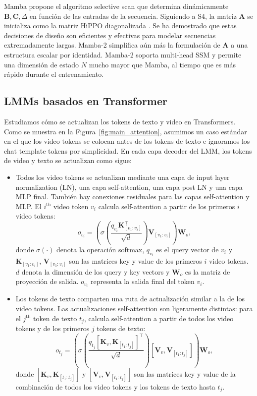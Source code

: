 Mamba propone el algoritmo selective scan que determina dinámicamente $\mathbf{B}, \mathbf{C}, \Delta$ en función de las entradas de la secuencia. Siguiendo a S4, la matriz $\mathbf{A}$ se inicializa como la matriz HiPPO diagonalizada \cite{gu2020hippo}. Se ha demostrado que estas decisiones de diseño son eficientes y efectivas para modelar secuencias extremadamente largas. Mamba-2 \cite{dao2024transformers} simplifica aún más la formulación de $\mathbf{A}$ a una estructura escalar por identidad. Mamba-2 soporta multi-head SSM y permite una dimensión de estado $N$ mucho mayor que Mamba, al tiempo que es más rápido durante el entrenamiento.


\subsection{LMMs basados en Transformer}
\label{sec:autoregressive_lmm}
Estudiamos cómo se actualizan los tokens de texto y video en Transformers. Como se muestra en la Figura~\ref{fig:main_attention}, asumimos un caso estándar en el que los video tokens se colocan antes de los tokens de texto e ignoramos los chat template tokens por simplicidad. En cada capa decoder del LMM, los tokens de video y texto se actualizan como sigue:
\begin{itemize}
    \item Todos los video tokens se actualizan mediante una capa de input layer normalization (LN), una capa self-attention, una capa post LN y una capa MLP final. También hay conexiones residuales para las capas self-attention y MLP. El $i^{\mathrm{th}}$ video token $v_i$ calcula self-attention a partir de los primeros $i$ video tokens:
    \begin{equation}
    \label{equ:causal_self_attention_video}
        o_{v_i}=(\sigma(\frac{q_{v_i} \mathbf{K}_{[v_1:v_i]}^\top}{\sqrt{d}})\mathbf{V}_{[v_1:v_i]})\mathbf{W}_{o},
    \end{equation}
    donde $\sigma(\cdot)$ denota la operación softmax, $q_{v_i}$ es el query vector de $v_i$ y $\mathbf{K}_{[v_1:v_i]}$, $\mathbf{V}_{[v_1:v_i]}$ son las matrices key y value de los primeros $i$ video tokens. $d$ denota la dimensión de los query y key vectors y $\mathbf{W}_{o}$ es la matriz de proyección de salida. $o_{v_i}$ representa la salida final del token $v_i$.
    \item Los tokens de texto comparten una ruta de actualización similar a la de los video tokens. Las actualizaciones self-attention son ligeramente distintas: para el $j^{\mathrm{th}}$ token de texto $t_j$, calcula self-attention a partir de todos los video tokens y de los primeros $j$ tokens de texto:
    \begin{equation}
    \label{equ:causal_self_attention_text}
        o_{t_j}=(\sigma(\frac{q_{t_j} [\mathbf{K}_v,\mathbf{K}_{[t_1:t_j]}]^\top}{\sqrt{d}})[\mathbf{V}_v,\mathbf{V}_{[t_1:t_j]}])\mathbf{W}_{o},
    \end{equation}
    donde $[\mathbf{K}_v,\mathbf{K}_{[t_1:t_j]}]$ y $[\mathbf{V}_v,\mathbf{V}_{[t_1:t_j]}]$ son las matrices key y value de la combinación de todos los video tokens y los tokens de texto hasta $t_j$.
\end{itemize}

